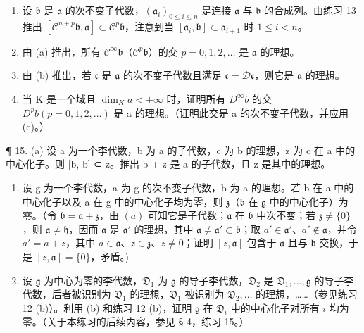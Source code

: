 \begin{enumerate}
\def\labelenumi{(\alph{enumi})}
\item
  设 \(\mathfrak{b}\) 是 \(\mathfrak{a}\) 的次不变子代数，\((\mathfrak{a}_i)_{0\leqslant i\leqslant n}\) 是连接 \(\mathfrak{a}\) 与 \(\mathfrak{b}\) 的合成列。由练习 13 推出 \([\mathcal{C}^{n+p}\mathfrak{b},\mathfrak{a}]\subset\mathcal{C}^{p}\mathfrak{b}\)，注意到当 \([\mathfrak{a}_i,\mathfrak{b}]\subset\mathfrak{a}_{i+1}\) 时 \(1\leqslant i<n\)。
\item
  由 (a) 推出，所有 \(\mathcal{C}^{\infty}\mathfrak{b}\)（\(\mathcal{C}^{p}\mathfrak{b}\)）的交 \(p = 0,1,2,\ldots\) 是 \(\mathfrak{a}\) 的理想。
\item
由 (b) 推出，若 \(\mathfrak{c}\) 是 \(\mathfrak{a}\) 的次不变子代数且满足 \(\mathfrak{c} = \mathcal{D}\mathfrak{c}\)，则它是 \(\mathfrak{a}\) 的理想。
\item
  当 K 是一个域且 \(\dim_{K}a<+\infty\) 时，证明所有 \(D^{\infty}b\) 的交 \(D^{p}b\left(p=0,1,2,\ldots\right)\) 是 a 的理想。（证明此交是 a 的次不变子代数，并应用 (c)。）
\end{enumerate}

¶ 15. (a) 设 a 为一个李代数，b 为 a 的子代数，c 为 b 的理想，z 为 c 在 a 中的中心化子。则 {[}b, b{]} ⊂ z。推出 b + z 是 a 的子代数，且 z 是其中的理想。

\begin{enumerate}
\def\labelenumi{(\alph{enumi})}
\setcounter{enumi}{1}
\item
  设 g 为一个李代数，a 为 g 的次不变子代数，b 为 a 的理想。若 b 在 a 中的中心化子以及 a 在 g 中的中心化子均为零，则 \(\mathfrak{z}\)（\(\mathfrak{b}\) 在 \(\mathfrak{g}\) 中的中心化子）为零。（令 \(\mathfrak{b} = \mathfrak{a} + \mathfrak{z}\)，由 \((a)\) 可知它是子代数；\(\mathfrak{a}\) 在 \(\mathfrak{b}\) 中次不变；若 \(\mathfrak{z} \neq \{0\}\)，则 \(\mathfrak{a} \neq \mathfrak{h}\)，因而 \(\mathfrak{a}\) 是 \(\mathfrak{a}'\) 的理想，其中 \(\mathfrak{a} \neq \mathfrak{a}' \subset \mathfrak{b}\)；取 \(a' \in \mathfrak{a}'\)、\(a' \notin \mathfrak{a}\)，并令 \(a' = a + z\)，其中 \(a \in \mathfrak{a}\)、\(z \in \mathfrak{z}\)、\(z \neq 0\)；证明 \([z, \mathfrak{a}]\) 包含于 \(\mathfrak{a}\) 且与 \(\mathfrak{b}\) 交换，于是 \([z, \mathfrak{a}] = \{0\}\)，矛盾。)
\item
设 \(\mathfrak{g}\) 为中心为零的李代数，\(\mathfrak{D}_1\) 为 \(\mathfrak{g}\) 的导子李代数，\(\mathfrak{D}_2\) 是 \(\mathfrak{D}_1, \ldots, \mathfrak{g}\) 的导子李代数，后者被识别为 \(\mathfrak{D}_1\) 的理想，\(\mathfrak{D}_1\) 被识别为 \(\mathfrak{D}_2, \ldots\) 的理想，……（参见练习 12 (b)）。利用 (b) 和练习 12 (b)，证明 \(\mathfrak{g}\) 在 \(\mathfrak{D}_i\) 中的中心化子对所有 \(i\) 均为零。（关于本练习的后续内容，参见 § 4，练习 15。）
\end{enumerate}

